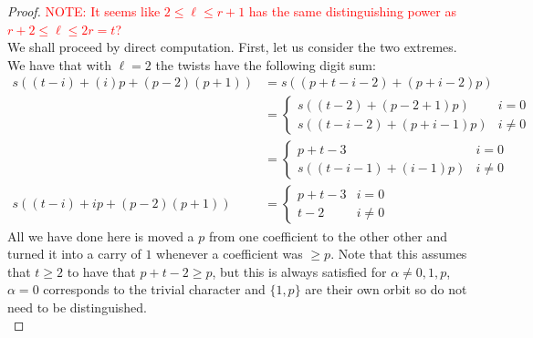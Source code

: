 \documentclass[12pt]{article}
\theoremstyle{customtheorem}%
\theoremstyle{remark}
\theoremstyle{definition}
\numberwithin{equation}{section}
\numberwithin{theorem}{section}
\begin{document}
\begin{proof}
\textcolor{red}{NOTE: It seems like $2 \leq \ell \leq r+1$ has the same distinguishing power as $r+2 \leq \ell \leq 2r=t$?}
\\

We shall proceed by direct computation. First, let us consider the two extremes. We have that with $\ell = 2$ the twists have the  following digit sum: \begin{align*}
 s((t-i) + (i)p + (p - 2)(p+1)) &= s((p + t - i - 2) + (p + i -2)p) \\ 
 &= \begin{cases}
s((t-2) + (p-2+1)p) & i = 0 \\
s((t-i-2) + (p+i-1)p)& i \neq 0
 \end{cases} \\
 &= \begin{cases}
 p+t - 3 & i = 0 \\
 s((t-i-1)+(i-1)p) & i \neq 0
 \end{cases} \\
  s((t-i) + ip + (p - 2)(p+1)) &= \begin{cases}
 p+t - 3 & i = 0 \\
 t-2 & i \neq 0
 \end{cases}
\end{align*}
All we have done here is moved a $p$ from one coefficient to the other other and turned it into a carry of $1$ whenever a coefficient was $\geq p$. Note that this assumes that $t \geq 2$ to have that $p+t-2 \geq p$, but this is always satisfied for $\alpha \neq 0,1,p$, $\alpha = 0$ corresponds to the trivial character and $\{1,p\}$ are their own orbit so do not need to be distinguished.
\\


\end{proof}
\end{document}

